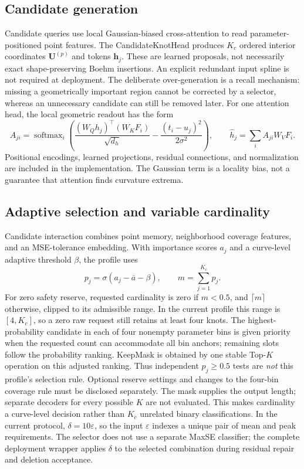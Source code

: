 \documentclass[preprint,12pt]{elsarticle}
\begin{document}
\subsection{Candidate generation}
Candidate queries use local Gaussian-biased cross-attention to read
parameter-positioned point features. The CandidateKnotHead produces
$K_c$ ordered interior coordinates $\bm U^{(p)}$ and tokens $\bm h_j$.
These are learned proposals, not necessarily exact shape-preserving Boehm
insertions. An explicit redundant input spline is not required at deployment.
The deliberate over-generation is a recall mechanism: missing a geometrically
important region cannot be corrected by a selector, whereas an unnecessary
candidate can still be removed later.
For one attention head, the local geometric readout has the form
\begin{equation}
 A_{ji}=\operatorname{softmax}_{i}\left(
 \frac{(W_Qh_j)^\top(W_KF_i)}{\sqrt{d_h}}
 -\frac{(t_i-u_j)^2}{2\sigma^2}\right),\qquad
 \widehat h_j=\sum_i A_{ji}W_VF_i.
\end{equation}
Positional encodings, learned projections, residual connections, and
normalization are included in the implementation. The Gaussian term is a
locality bias, not a guarantee that attention finds curvature extrema.

\subsection{Adaptive selection and variable cardinality}
Candidate interaction combines point memory, neighborhood coverage features,
and an MSE-tolerance embedding. With importance scores $a_j$ and a curve-level
adaptive threshold $\beta$, the profile uses
\begin{equation}
p_j=\sigma(a_j-\bar a-\beta),\qquad m=\sum_{j=1}^{K_c}p_j.
\end{equation}
For zero safety reserve, requested cardinality is zero if $m<0.5$, and
$\lceil m\rceil$ otherwise, clipped to its admissible range. In the current
profile this range is $[4,K_c]$, so a zero raw request still retains at least
four knots. The highest-probability candidate in each of four nonempty
parameter bins is given priority when the requested count can accommodate
all bin anchors; remaining slots follow the probability ranking. KeepMask
is obtained by one stable Top-$K$ operation on this adjusted ranking. Thus independent
$p_j\geq0.5$ tests are \emph{not} this profile's selection rule. Optional
reserve settings and changes to the four-bin coverage rule must be disclosed
separately. The mask supplies the output length; separate decoders for every
possible $K$ are not evaluated. This makes cardinality a curve-level decision
rather than $K_c$ unrelated binary classifications. In the current protocol,
$\delta=10\varepsilon$, so the input $\varepsilon$ indexes a unique pair of
mean and peak requirements. The selector does not use a separate MaxSE
classifier; the complete deployment wrapper applies $\delta$ to the selected
combination during residual repair and deletion acceptance.
\end{document}
